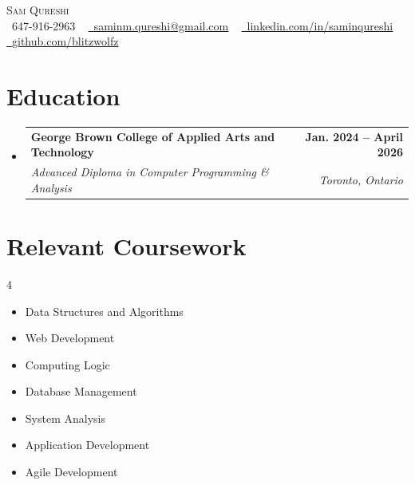 \documentclass[letterpaper,11pt]{article}
\makeatletter
\newcommand{\resumeSubheading}[4]{
  \vspace{-2pt}\item
    \begin{tabular*}{1.0\textwidth}[t]{l@{\extracolsep{\fill}}r}
      \textbf{#1} & \textbf{\small #2} \\
      \textit{\small#3} & \textit{\small #4} \\
    \end{tabular*}\vspace{-7pt}
}
\newcommand{\resumeSubHeadingListStart}{\begin{itemize}[leftmargin=0.0in, label={}]}
\newcommand{\resumeSubHeadingListEnd}{\end{itemize}}
\makeatother
\begin{document}

\begin{center}
    {\Huge \scshape Sam Qureshi} \\ \vspace{1pt}
    \small \raisebox{-0.1\height}\faPhone\ 647-916-2963 ~ \href{mailto:x@gmail.com}{\raisebox{-0.2\height}\faEnvelope\  \underline{saminm.qureshi@gmail.com}} ~ 
    \href{https://linkedin.com/in//}{\raisebox{-0.2\height}\faLinkedin\ \underline{linkedin.com/in/saminqureshi}}  ~
    \href{https://github.com/}{\raisebox{-0.2\height}\faGithub\ \underline{github.com/blitzwolfz}}
    \vspace{-8pt}
\end{center}


\section{Education}
  \resumeSubHeadingListStart
    \resumeSubheading
      {George Brown College of Applied Arts and Technology}{Jan. 2024 -- April 2026}
      {Advanced Diploma in Computer Programming \& Analysis}{Toronto, Ontario}
  \resumeSubHeadingListEnd

\section{Relevant Coursework}
        \begin{multicols}{4}
            \begin{itemize}[itemsep=-5pt, parsep=3pt]
                \item\small {Data Structures and Algorithms}
                \item Web Development
                \item Computing Logic
                \item Database Management
                \item System Analysis
                \item Application Development
                \item Agile Development
            \end{itemize}
        \end{multicols}
        \vspace*{2.0\multicolsep}
\end{document}

